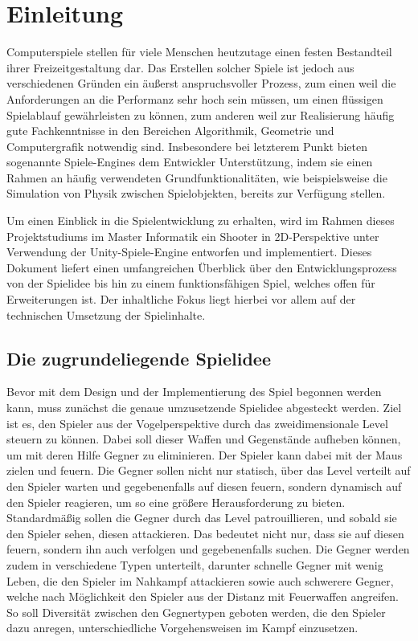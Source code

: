 \section{Einleitung}\label{sec:introduction}
Computerspiele stellen für viele Menschen heutzutage einen festen Bestandteil ihrer Freizeitgestaltung dar. Das Erstellen solcher Spiele ist jedoch aus verschiedenen Gründen ein äußerst anspruchsvoller Prozess, zum einen weil die Anforderungen an die Performanz sehr hoch sein müssen, um einen flüssigen Spielablauf gewährleisten zu können, zum anderen weil zur Realisierung häufig gute Fachkenntnisse in den Bereichen Algorithmik, Geometrie und Computergrafik notwendig sind. Insbesondere bei letzterem Punkt bieten sogenannte Spiele-Engines dem Entwickler Unterstützung, indem sie einen Rahmen an häufig verwendeten Grundfunktionalitäten, wie beispielsweise die Simulation von Physik zwischen Spielobjekten, bereits zur Verfügung stellen.

Um einen Einblick in die Spielentwicklung zu erhalten, wird im Rahmen dieses Projektstudiums im Master Informatik ein Shooter in 2D-Perspektive unter Verwendung der Unity-Spiele-Engine entworfen und implementiert. Dieses Dokument liefert einen umfangreichen Überblick über den Entwicklungsprozess von der Spielidee bis hin zu einem funktionsfähigen Spiel, welches offen für Erweiterungen ist. Der inhaltliche Fokus liegt hierbei vor allem auf der technischen Umsetzung der Spielinhalte.

\subsection{Die zugrundeliegende Spielidee}\label{sec:gameIdea}
Bevor mit dem Design und der Implementierung des Spiel begonnen werden kann, muss zunächst die genaue umzusetzende Spielidee abgesteckt werden. Ziel ist es, den Spieler aus der Vogelperspektive durch das zweidimensionale Level steuern zu können. Dabei soll dieser Waffen und Gegenstände aufheben können, um mit deren Hilfe Gegner zu eliminieren. Der Spieler kann dabei mit der Maus zielen und feuern. Die Gegner sollen nicht nur statisch, über das Level verteilt auf den Spieler warten und gegebenenfalls auf diesen feuern, sondern dynamisch auf den Spieler reagieren, um so eine größere Herausforderung zu bieten. Standardmäßig sollen die Gegner durch das Level patrouillieren, und sobald sie den Spieler sehen, diesen attackieren. Das bedeutet nicht nur, dass sie auf diesen feuern, sondern ihn auch verfolgen und gegebenenfalls suchen. Die Gegner werden zudem in verschiedene Typen unterteilt, darunter schnelle Gegner mit wenig Leben, die den Spieler im Nahkampf attackieren sowie auch schwerere Gegner, welche nach Möglichkeit den Spieler aus der Distanz mit Feuerwaffen angreifen. So soll Diversität zwischen den Gegnertypen geboten werden, die den Spieler dazu anregen, unterschiedliche Vorgehensweisen im Kampf einzusetzen.

